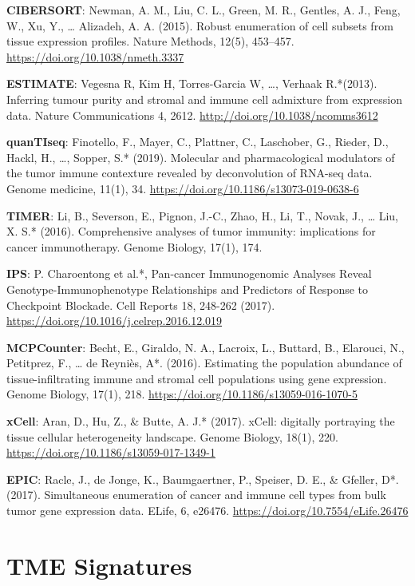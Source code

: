 \documentclass[
  12pt,
]{book}
\begin{document}
\textbf{CIBERSORT}: Newman, A. M., Liu, C. L., Green, M. R., Gentles, A. J., Feng, W., Xu, Y., \ldots{} Alizadeh, A. A. (2015). Robust enumeration of cell subsets from tissue expression profiles. Nature Methods, 12(5), 453--457. \url{https://doi.org/10.1038/nmeth.3337}

\textbf{ESTIMATE}: Vegesna R, Kim H, Torres-Garcia W, \ldots, Verhaak R.*(2013). Inferring tumour purity and stromal and immune cell admixture from expression data. Nature Communications 4, 2612. \url{http://doi.org/10.1038/ncomms3612}

\textbf{quanTIseq}: Finotello, F., Mayer, C., Plattner, C., Laschober, G., Rieder, D., Hackl, H., \ldots, Sopper, S.* (2019). Molecular and pharmacological modulators of the tumor immune contexture revealed by deconvolution of RNA-seq data. Genome medicine, 11(1), 34. \url{https://doi.org/10.1186/s13073-019-0638-6}

\textbf{TIMER}: Li, B., Severson, E., Pignon, J.-C., Zhao, H., Li, T., Novak, J., \ldots{} Liu, X. S.* (2016). Comprehensive analyses of tumor immunity: implications for cancer immunotherapy. Genome Biology, 17(1), 174.

\textbf{IPS}: P. Charoentong et al.*, Pan-cancer Immunogenomic Analyses Reveal Genotype-Immunophenotype Relationships and Predictors of Response to Checkpoint Blockade. Cell Reports 18, 248-262 (2017). \url{https://doi.org/10.1016/j.celrep.2016.12.019}

\textbf{MCPCounter}: Becht, E., Giraldo, N. A., Lacroix, L., Buttard, B., Elarouci, N., Petitprez, F., \ldots{} de Reyniès, A*. (2016). Estimating the population abundance of tissue-infiltrating immune and stromal cell populations using gene expression. Genome Biology, 17(1), 218. \url{https://doi.org/10.1186/s13059-016-1070-5}

\textbf{xCell}: Aran, D., Hu, Z., \& Butte, A. J.* (2017). xCell: digitally portraying the tissue cellular heterogeneity landscape. Genome Biology, 18(1), 220. \url{https://doi.org/10.1186/s13059-017-1349-1}

\textbf{EPIC}: Racle, J., de Jonge, K., Baumgaertner, P., Speiser, D. E., \& Gfeller, D*. (2017). Simultaneous enumeration of cancer and immune cell types from bulk tumor gene expression data. ELife, 6, e26476. \url{https://doi.org/10.7554/eLife.26476}

\hypertarget{tme-signatures}{%
\section{TME Signatures}\label{tme-signatures}}
\end{document}
